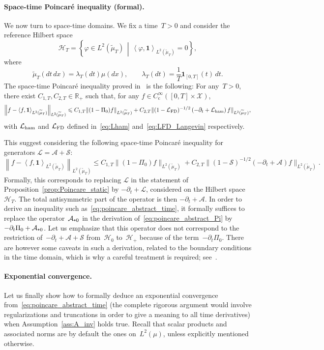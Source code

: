 \documentclass{article}
\newcommand{\cL}{\mathcal{L}}
\newcommand{\cLs}{\mathcal{S}}
\newcommand{\cLa}{\mathcal{A}}
\newcommand{\cLham}{\mathcal{L}_{\rm ham}}
\newcommand{\cLFD}{\mathcal{L}_{\rm FD}}
\newcommand{\cX}{\mathcal{X}}
\newcommand{\cH}{\mathcal{H}}
\newcommand{\subplus}{\textnormal{\texttt{+}}}
\renewcommand{\leq}{\leqslant}
\begin{document}
\paragraph{Space-time Poincar\'e inequality (formal).}
We now turn to space-time domains. We fix a time~$T>0$ and consider the reference Hilbert space 
\[
\cH_T = \left\{ \varphi \in L^2(\widetilde{\mu}_T) \, \middle| \, \left\langle \varphi,\mathbf{1}\right\rangle_{L^2(\widetilde{\mu}_T)} = 0 \right\},
\]
where
\[
\widetilde{\mu}_T(dt \, dx) = \lambda_T(dt) \mu(dx), \qquad \lambda_T(dt) = \frac1T \mathbf{1}_{[0,T]}(t) \, dt.
\]
The space-time Poincar\'e inequality proved in~\cite{AM19,CLW19} is the following: For any~$T>0$, there exist $C_{1,T},C_{2,T}\in \mathbb{R}_+$ such that, for any $f \in C_\mathrm{c}^\infty([0,T] \times \cX)$,
\[
  \left\| f-\left\langle f,\mathbf{1}\right\rangle_{L^2(\widetilde{\mu}_T)}\right\|_{L^2(\widetilde{\mu}_T)} \leq C_{1,T} \| (1-\Pi_0)f \|_{L^2(\widetilde{\mu}_T)} + C_{2,T} \| (1-\cLFD)^{-1/2}\left(-\partial_t + \cLham\right) f \|_{L^2(\widetilde{\mu}_T)},
\]
with $\cLham$ and $\cLFD$ defined in~\eqref{eq:Lham} and~\eqref{eq:LFD_Langevin} respectively. 

This suggest considering the following space-time Poincar\'e inequality for generators $\cL = \cLa + \cLs$:
\begin{equation}
  \label{eq:poincare_abstract_time}
  \left\| f-\left\langle f,\mathbf{1}\right\rangle_{L^2(\widetilde{\mu}_T)}\right\|_{L^2(\widetilde{\mu}_T)} \leq C_{1,T} \| (1-\Pi_0)f \|_{L^2(\widetilde{\mu}_T)} + C_{2,T} \| (1-\cLs)^{-1/2}\left(-\partial_t + \cLa\right) f \|_{L^2(\widetilde{\mu}_T)}.
\end{equation}
Formally, this corresponds to replacing $\cL$ in the statement of Proposition~\ref{prop:Poincare_static} by $-\partial_t + \cL$, considered on the Hilbert space~$\cH_T$. The total antisymmetric part of the operator is then $-\partial_t + \cLa$. In order to derive an inequality such as~\eqref{eq:poincare_abstract_time}, it formally suffices to replace the operator~$\cLa_{\subplus 0}$ in the derivation of~\eqref{eq:poincare_abstract_Pi} by $-\partial_t \Pi_0 + \cLa_{\subplus 0}$. Let us emphasize that this operator does not correspond to the restriction of~$-\partial_t + \cLa + \cLs$ from~$\cH_0$ to~$\cH_+$ because of the term~$-\partial_t \Pi_0$. There are however some caveats in such a derivation, related to the boundary conditions in the time domain, which is why a careful treatment is required; see~\cite[Lemma~2.6]{CLW19}.

\paragraph{Exponential convergence.} 
Let us finally show how to formally deduce an exponential convergence from~\eqref{eq:poincare_abstract_time} (the complete rigorous argument would involve regularizations and truncations in order to give a meaning to all time derivatives) when Assumption~\ref{ass:A_inv} holds true. Recall that scalar products and associated norms are by default the ones on~$L^2(\mu)$, unless explicitly mentioned otherwise.
\end{document}
